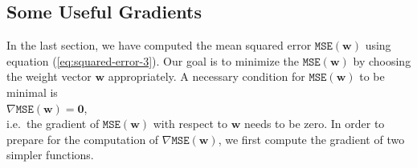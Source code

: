 \subsection{Some Useful Gradients}
In the last section, we have computed the mean squared error $\mathtt{MSE}(\mathbf{w})$ using equation
(\ref{eq:squared-error-3}).  Our goal is to minimize the $\mathtt{MSE}(\mathbf{w})$ by choosing the weight
vector $\mathbf{w}$ appropriately.  A necessary condition for $\mathtt{MSE}(\mathbf{w})$ to be minimal is 
\\[0.2cm]
\hspace*{1.3cm}
$\nabla \mathtt{MSE}(\mathbf{w}) = \mathbf{0}$,
\\[0.2cm]
i.e.~the gradient of $\mathtt{MSE}(\mathbf{w})$ with respect to $\mathbf{w}$ needs to be zero.  In order to prepare for the computation of
$\nabla \mathtt{MSE}(\mathbf{w})$, we first compute the gradient of two simpler functions.

